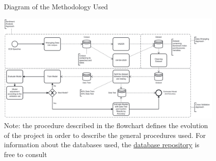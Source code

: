 \begin{landscape}
\begin{figure}
    \centering
    \caption{Diagram of the Methodology Used}
    \includegraphics[width = \linewidth]{images/diagram.pdf}
    \caption*{Note: the procedure described in the flowchart defines the evolution of the project in order to describe the general procedures used. For information about the databases used, the \href{https://github.com/gustavovital/Dissertation/tree/main/data}{database repository} is free to consult}
    \label{fig:diagram}
\end{figure}
\end{landscape}









